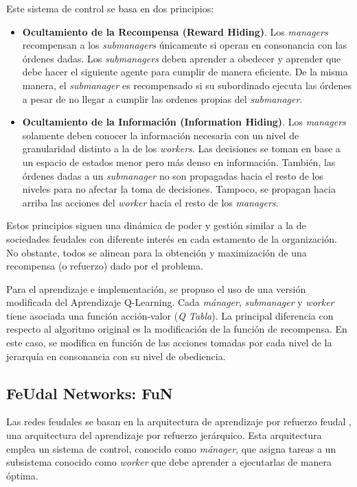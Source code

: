 \documentclass[letterpaper]{article} %
\begin{document}
Este sistema de control se basa en dos principios:
\begin{itemize}
    \item \textbf{Ocultamiento de la Recompensa (Reward Hiding)}. Los \textit{managers} recompensan a los \textit{submanagers} únicamente si operan 
    en consonancia con las órdenes dadas. Los \textit{submanagers} deben aprender a obedecer y aprender que debe hacer el siguiente agente para 
    cumplir de manera eficiente. De la misma manera, el \textit{submanager} es recompensado si su subordinado ejecuta las órdenes a pesar de no llegar a cumplir 
    las ordenes propias del \textit{submanager}.

    \item \textbf{Ocultamiento de la Información (Information Hiding)}. Los \textit{managers} solamente deben conocer la información necesaria 
    con un nivel de granularidad distinto a la de los \textit{workers}. Las decisiones se toman en base a un espacio de estados menor pero más
    denso en información. También, las órdenes dadas a un \textit{submanager} no son propagadas hacia el resto de los niveles para no afectar la toma
    de decisiones. Tampoco, se propagan hacia arriba las acciones del \textit{worker} hacia el resto de los \textit{managers}. 
\end{itemize}

Estos principios siguen una dinámica de poder y gestión similar a la de sociedades feudales con diferente interés en cada estamento de la organización.
No obstante, todos se alinean para la obtención y maximización de una recompensa (o refuerzo) dado por el problema.

Para el aprendizaje e implementación, se propuso el uso de una versión modificada del Aprendizaje Q-Learning. Cada \textit{mánager}, \textit{submanager} y
\textit{worker} tiene asociada una función acción-valor (\textit{Q Tabla}). La principal diferencia con respecto al algoritmo original es la 
modificación de la función de recompensa. En este caso, se modifica en función de las acciones tomadas por cada nivel de la jerarquía en consonancia 
con su nivel de obediencia. 

\subsection{FeUdal Networks: FuN}

Las redes feudales se basan en la arquitectura de aprendizaje por refuerzo feudal \cite{vezhnevets2017feudal}, 
una arquitectura del aprendizaje por refuerzo jerárquico. Esta arquitectura emplea un sistema de control, conocido
como \textit{mánager}, que asigna tareas a un subsistema conocido como \textit{worker} que debe aprender a ejecutarlas de manera óptima.
\end{document}
